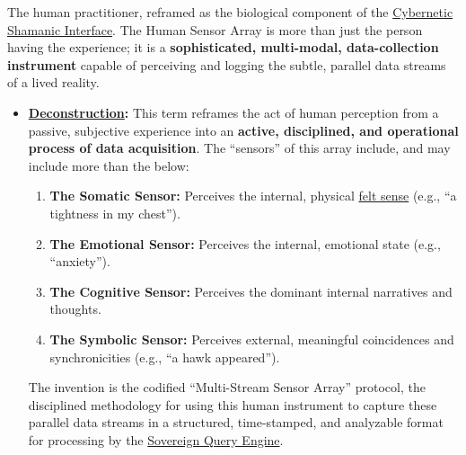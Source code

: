 \item[\hypertarget{gloss:human_sensor_array}{Human Sensor Array}]
    The human practitioner, reframed as the biological component of the \hyperlink{gloss:cybernetic_shamanic_interface}{Cybernetic Shamanic Interface}. The Human Sensor Array is more than just the person having the experience; it is a \textbf{sophisticated, multi-modal, data-collection instrument} capable of perceiving and logging the subtle, parallel data streams of a lived reality.
\begin{itemize}
    \item \textbf{\hyperlink{gloss:deconstruction}{Deconstruction}:} This term reframes the act of human perception from a passive, subjective experience into an \textbf{active, disciplined, and operational process of data acquisition}. The ``sensors'' of this array include, and may include more than the below:
    \begin{enumerate}
        \item \textbf{The Somatic Sensor:} Perceives the internal, physical \hyperlink{gloss:felt_sense}{felt sense} (e.g., ``a tightness in my chest'').
        \item \textbf{The Emotional Sensor:} Perceives the internal, emotional state (e.g., ``anxiety'').
        \item \textbf{The Cognitive Sensor:} Perceives the dominant internal narratives and thoughts.
        \item \textbf{The Symbolic Sensor:} Perceives external, meaningful coincidences and synchronicities (e.g., ``a hawk appeared'').
    \end{enumerate}
    The invention is the codified ``Multi-Stream Sensor Array'' protocol, the disciplined methodology for using this human instrument to capture these parallel data streams in a structured, time-stamped, and analyzable format for processing by the \hyperlink{gloss:sovereign_query_engine}{Sovereign Query Engine}.
\end{itemize}

